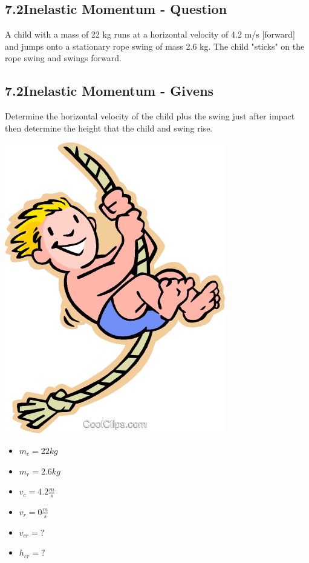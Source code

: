 \subsection*{7.2\hspace*{0.5cm}Inelastic Momentum - Question}
A child with a mass of 22 kg runs at a horizontal velocity of 4.2 m/s [forward] and jumps onto a stationary rope swing of mass 2.6 kg. The child "sticks" on the rope swing and swings forward.
\subsection*{7.2\hspace*{0.5cm}Inelastic Momentum - Givens}
Determine the horizontal velocity of the child plus the swing just after impact then determine the height that the child and swing rise.\newline\newline
\begin{minipage}{0.5\textwidth}
    \includegraphics[scale=0.33]{./images/child_rope}
\end{minipage}
\begin{minipage}{0.5\textwidth}
    \begin{itemize}
        \item $m_{c} = 22kg$
        \item $m_{r} = 2.6kg$
        \item $v_{c} = 4.2\frac{m}{s}$
        \item $v_{r} = 0\frac{m}{s}$
        \item $v_{cr} = ?$
        \item $h_{cr} = ?$
    \end{itemize}
\end{minipage}

